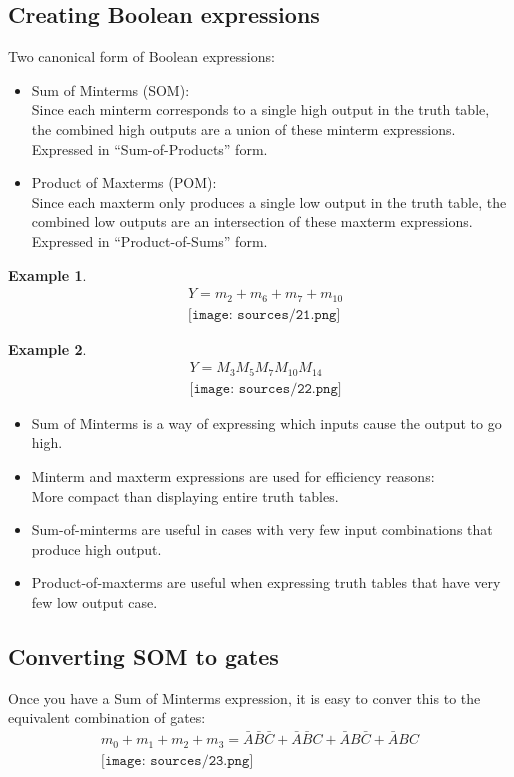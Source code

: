 \documentclass[12pt]{article}
\theoremstyle{definition}
\newtheorem{example}{Example}[section]
\begin{document}
\subsection{Creating Boolean expressions}
Two canonical form of Boolean expressions:
\begin{itemize}
    \item Sum of Minterms (SOM):\\Since each minterm corresponds to a single high
    output in the truth table, the combined high outputs
    are a union of these minterm expressions. Expressed in “Sum-of-Products” form.
    \item Product of Maxterms (POM):\\Since each maxterm only produces a single low
    output in the truth table, the combined low outputs
    are an intersection of these maxterm expressions. Expressed in “Product-of-Sums” form.
\end{itemize}
\newpage
\begin{example}
    \ \\
    \begin{align*}
        &Y=m_2+m_6+m_7+m_{10}\\
        &\texttt{[image: sources/21.png]}
    \end{align*}
\end{example}
\newpage
\begin{example}
    \ \\
    \begin{align*}
        &Y=M_3M_5M_7M_{10}M_{14}\\
        &\texttt{[image: sources/22.png]}
    \end{align*}
\end{example}
\begin{itemize}
    \item Sum of Minterms is a way of expressing which inputs cause the output to go high.
    \item Minterm and maxterm expressions are used for efficiency reasons:\\More compact than displaying entire truth tables.
    \item Sum-of-minterms are useful in cases with very few input combinations that produce high output.
    \item Product-of-maxterms are useful when expressing truth tables that have very few low output case.
\end{itemize}
\subsection{Converting SOM to gates}
Once you have a Sum of Minterms expression, it is easy to conver this to the equivalent combination of gates:
\begin{align*}
    m_0+m_1+m_2+m_3=\bar{A}\bar{B}\bar{C}+\bar{A}\bar{B}C+\bar{A}B\bar{C}+\bar{A}BC\\
    \texttt{[image: sources/23.png]}
\end{align*}
\end{document}
